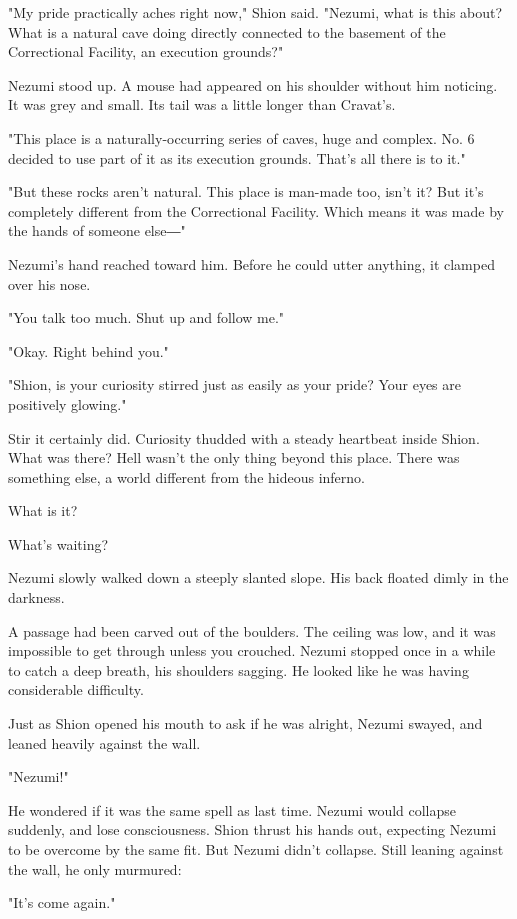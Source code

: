 "My pride practically aches right now," Shion said. "Nezumi, what is
this about? What is a natural cave doing directly connected to the
basement of the Correctional Facility, an execution grounds?"

Nezumi stood up. A mouse had appeared on his shoulder without him
noticing. It was grey and small. Its tail was a little longer than
Cravat's.

"This place is a naturally-occurring series of caves, huge and complex.
No. 6 decided to use part of it as its execution grounds. That's all
there is to it."

"But these rocks aren't natural. This place is man-made too, isn't it?
But it's completely different from the Correctional Facility. Which
means it was made by the hands of someone else―"

Nezumi's hand reached toward him. Before he could utter anything, it
clamped over his nose.

"You talk too much. Shut up and follow me."

"Okay. Right behind you."

"Shion, is your curiosity stirred just as easily as your pride? Your
eyes are positively glowing."

Stir it certainly did. Curiosity thudded with a steady heartbeat inside
Shion. What was there? Hell wasn't the only thing beyond this place.
There was something else, a world different from the hideous inferno.

What is it?

What's waiting?

Nezumi slowly walked down a steeply slanted slope. His back floated
dimly in the darkness.

A passage had been carved out of the boulders. The ceiling was low, and
it was impossible to get through unless you crouched. Nezumi stopped
once in a while to catch a deep breath, his shoulders sagging. He looked
like he was having considerable difficulty.

Just as Shion opened his mouth to ask if he was alright, Nezumi swayed,
and leaned heavily against the wall.

"Nezumi!"

He wondered if it was the same spell as last time. Nezumi would collapse
suddenly, and lose consciousness. Shion thrust his hands out, expecting
Nezumi to be overcome by the same fit. But Nezumi didn't collapse. Still
leaning against the wall, he only murmured:

"It's come again."

